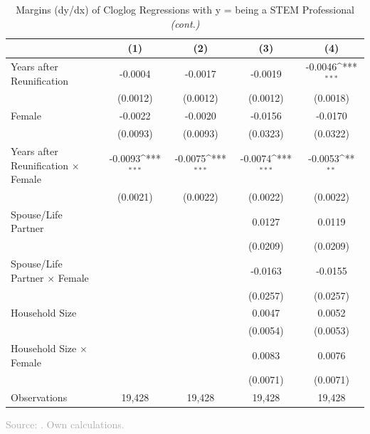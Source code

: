 \documentclass[11pt, aspectratio=1610, xcolor={dvipsnames}]{beamer}
\def\sym#1{\ifmmode^{#1}\else\(^{#1}\)\fi}
\begin{document}
	\begin{frame}
		\frametitle{}
		
		{\linespread{1}\tiny
			\begin{table}[h]
				\centering
				\caption{Margins (dy/dx) of Cloglog Regressions with y = being a STEM Professional \emph{(cont.)}}
				\label{tab:margins2}
				\begin{tabular}{l*{4}{c}}
					\toprule
					&\multicolumn{1}{c}{(1)}         &\multicolumn{1}{c}{(2)}         &\multicolumn{1}{c}{(3)}         &\multicolumn{1}{c}{(4)}         \\
					\midrule
					Years after Reunification&     -0.0004         &     -0.0017         &     -0.0019         &     -0.0046\sym{***}\\
					&    (0.0012)         &    (0.0012)         &    (0.0012)         &    (0.0018)         \\
					\addlinespace
					Female              &     -0.0022         &     -0.0020         &     -0.0156         &     -0.0170         \\
					&    (0.0093)         &    (0.0093)         &    (0.0323)         &    (0.0322)         \\
					\addlinespace
					Years after Reunification $\times$ Female&     -0.0093\sym{***}&     -0.0075\sym{***}&     -0.0074\sym{***}&     -0.0053\sym{**} \\
					&    (0.0021)         &    (0.0022)         &    (0.0022)         &    (0.0022)         \\
					\midrule
					Spouse/Life Partner &                     &                     &      0.0127         &      0.0119         \\
					&                     &                     &    (0.0209)         &    (0.0209)         \\
					\addlinespace
					Spouse/Life Partner $\times$ Female&                     &                     &     -0.0163         &     -0.0155         \\
					&                     &                     &    (0.0257)         &    (0.0257)         \\
					\addlinespace
					Household Size      &                     &                     &      0.0047         &      0.0052         \\
					&                     &                     &    (0.0054)         &    (0.0053)         \\
					\addlinespace
					Household Size $\times$ Female&                     &                     &      0.0083         &      0.0076         \\
					&                     &                     &    (0.0071)         &    (0.0071)         \\
					\midrule
					Observations        &       19,428         &       19,428         &       19,428         &       19,428         \\
					\bottomrule
				\end{tabular}
			\end{table}
		}
		
		{\scriptsize
			\textcolor{darkgray}{Source: \cite{SOEP2023}. Own calculations.}
		}
		
	\end{frame}
	
\end{document}
